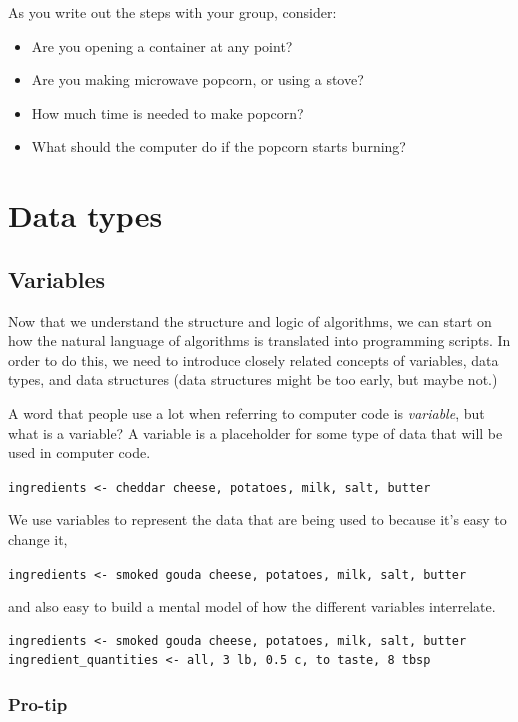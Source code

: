 \documentclass[
]{book}
\providecommand{\tightlist}{%
  \setlength{\itemsep}{0pt}\setlength{\parskip}{0pt}}
\begin{document}
As you write out the steps with your group, consider:

\begin{itemize}
\tightlist
\item
  Are you opening a container at any point?
\item
  Are you making microwave popcorn, or using a stove?
\item
  How much time is needed to make popcorn?
\item
  What should the computer do if the popcorn starts burning?
\end{itemize}

\chapter{Data types}\label{data-types}

\section{Variables}\label{variables}

Now that we understand the structure and logic of algorithms, we can start on how the natural language of algorithms is translated into programming scripts. In order to do this, we need to introduce closely related concepts of variables, data types, and data structures (data structures might be too early, but maybe not.)

A word that people use a lot when referring to computer code is \emph{variable}, but what is a variable? A variable is a placeholder for some type of data that will be used in computer code.

\texttt{ingredients\ \textless{}-\ cheddar\ cheese,\ potatoes,\ milk,\ salt,\ butter}

We use variables to represent the data that are being used to because it's easy to change it,

\texttt{ingredients\ \textless{}-\ smoked\ gouda\ cheese,\ potatoes,\ milk,\ salt,\ butter}

and also easy to build a mental model of how the different variables interrelate.

\begin{verbatim}
ingredients <- smoked gouda cheese, potatoes, milk, salt, butter
ingredient_quantities <- all, 3 lb, 0.5 c, to taste, 8 tbsp
\end{verbatim}

\subsection{Pro-tip}\label{pro-tip}
\end{document}

